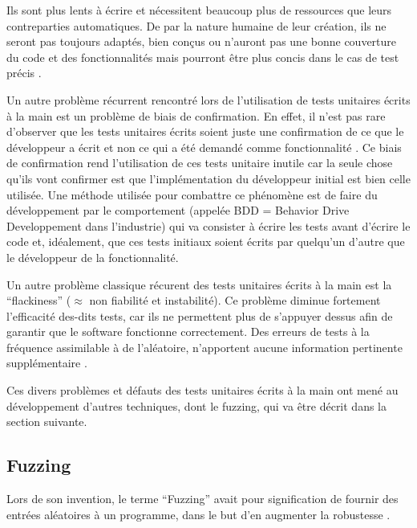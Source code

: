 \documentclass[a4paper]{report}
\begin{document}
Ils sont plus lents à écrire et nécessitent beaucoup plus de ressources que leurs contreparties automatiques.
De par la nature humaine de leur création, ils ne seront pas toujours adaptés, bien conçus ou n'auront pas une bonne couverture du code et des fonctionnalités mais pourront être plus concis dans le cas de test précis \cite{Zhu1997}.

Un autre problème récurrent rencontré lors de l'utilisation de tests unitaires écrits à la main est un problème de biais de confirmation.
En effet, il n'est pas rare d'observer que les tests unitaires écrits soient juste une confirmation de ce que le développeur a écrit et non ce qui a été demandé comme fonctionnalité \cite{Calikli2014}.
Ce biais de confirmation rend l'utilisation de ces tests unitaire inutile car la seule chose qu'ils vont confirmer est que l'implémentation du développeur initial est bien celle utilisée.
Une méthode utilisée pour combattre ce phénomène est de faire du développement par le comportement (appelée BDD = Behavior Drive Developpement dans l'industrie) qui va consister à écrire les tests avant d'écrire le code et, idéalement, que ces tests initiaux soient écrits par quelqu'un d'autre que le développeur de la fonctionnalité.

Un autre problème classique récurent des tests unitaires écrits à la main est la “flackiness” ($\approx$ non fiabilité et instabilité).
Ce problème diminue fortement l'efficacité des-dits tests, car ils ne permettent plus de s'appuyer dessus afin de garantir que le software fonctionne correctement.
Des erreurs de tests à la fréquence assimilable à de l'aléatoire, n'apportent aucune information pertinente supplémentaire \cite{Luo2014}.


Ces divers problèmes et défauts des tests unitaires écrits à la main ont mené au développement d’autres techniques, dont le fuzzing, qui va être décrit dans la section suivante.

\subsection{Fuzzing}

Lors de son invention, le terme “Fuzzing” avait pour signification de fournir des entrées aléatoires à un programme, dans le but d'en augmenter la robustesse \cite{Forrester2000}.
\end{document}
